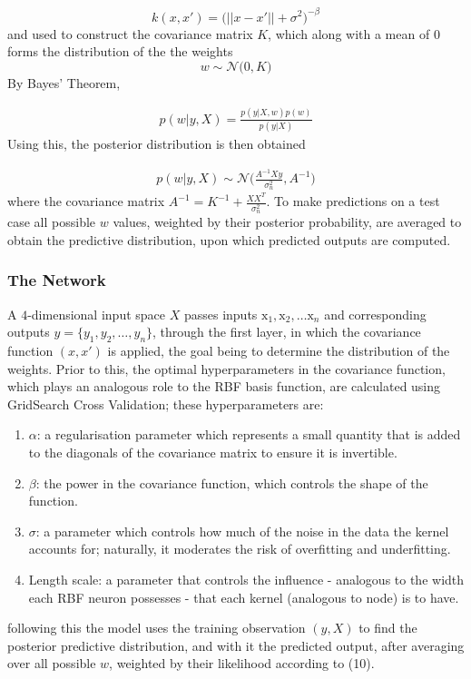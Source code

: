\documentclass[11pt,a4paper]{article}
\begin{document}
$$ k(x,x') = \biggl( ||x-x'|| + \sigma^2\biggr)^{-\beta} $$
and used to construct the covariance matrix $K$, which along with 
a mean of $0$ forms the distribution of the the weights 
$$ w \sim \mathcal{N}\bigl(0, K\bigr)$$
By Bayes' Theorem, 

\begin{align}
    p(w|y, X) = \frac{p(y|X,w) p(w)}{p(y|X)}
\end{align}
Using this, the posterior distribution is then obtained

\begin{align}
    p(w|y, X) \sim \mathcal{N}\bigl(\frac{A^{-1}Xy}{\sigma_{n}^{2}}, A^{-1}\bigr)
\end{align}
where the covariance matrix $A^{-1} = K^{-1} + \frac{XX^T}{\sigma_{n}^2}$.
To make predictions on a test case all possible $w$
values, weighted by their posterior probability, are averaged to obtain the
predictive distribution, upon which predicted outputs are computed.

\subsubsection{The Network}

A $4$-dimensional input space $X$
passes inputs $\boldsymbol{\mathrm{x}}_1, \boldsymbol{\mathrm{x}}_2,\ldots \boldsymbol{\mathrm{x}}_{n}$
and corresponding outputs \( y = \{y_1, y_2, \dots, y_n\} \), through the first
layer, in which the covariance function $(x,x')$
is applied, the goal being to determine the distribution of the weights. Prior to this,
the optimal hyperparameters in the covariance function, which plays an analogous
role to the RBF basis function, are calculated using GridSearch Cross Validation; these hyperparameters are:
\begin{enumerate}
    \item $\alpha$: a regularisation parameter which represents a small quantity
    that is added to the diagonals of the covariance matrix to ensure it is 
    invertible. 
    \item $\beta$: the power in the covariance function, which controls the shape of the function.
    \item $\sigma$: a parameter which controls how much of the noise in the data the kernel accounts for; naturally, 
    it moderates the risk of overfitting and underfitting.
    \item Length scale: a parameter that controls the influence - analogous to 
    the width each RBF neuron possesses - that each kernel (analogous to node) is to have.
\end{enumerate}
following this the model uses the training observation $(y,X)$ to find
the posterior predictive distribution, and with it the predicted output, after 
averaging over all possible $w$, weighted by their likelihood according to (10). 
\end{document}

